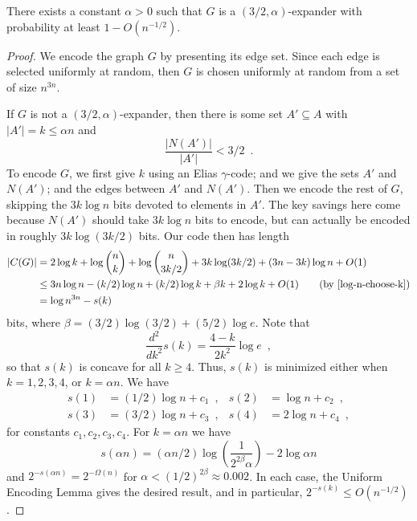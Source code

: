 \documentclass{patmorin}
\begin{document}
\begin{thm}
  There exists a constant $\alpha >0$ such that $G$ is a
  $(3/2,\alpha)$-expander with probability at least $1 - O(n^{-1/2})$.
\end{thm}

\begin{proof}
  We encode the graph $G$ by presenting its edge set. Since each edge
  is selected uniformly at random, then $G$ is chosen uniformly at
  random from a set of size $n^{3n}$.
  
  If $G$ is not a $(3/2, \alpha)$-expander, then there is some set $A'
  \subseteq A$ with $|A'|=k\le \alpha n$ and
  \[
  \frac{|N(A')|}{|A'|} < 3/2 \enspace .
  \]
  To encode $G$, we first give $k$ using an Elias $\gamma$-code; and
  we give the sets $A'$ and $N(A')$; and the edges between $A'$ and
  $N(A')$. Then we encode the rest of $G$, skipping the $3k\log n$
  bits devoted to elements in $A'$.  The key savings here come because
  $N(A')$ should take $3k\log n$ bits to encode, but can actually be
  encoded in roughly $3k\log(3k/2)$ bits. Our code then has length
  \begin{align*}
    |C(G)| &= 2\log k + \log {n \choose k} + \log {n \choose 3k/2} + 3k \log (3k/2) + (3n - 3k)\log n + O(1) \\
           &\leq 3n \log n - (k/2)\log n + (k/2)\log k + \beta k + 2 \log k + O(1) \tag{by \eqref{log-n-choose-k}}\\
           &= \log n^{3n} - s(k)
  \end{align*}
  bits, where $\beta = (3/2) \log (3/2) + (5/2) \log e$. Note that
  \[
    \frac{d^2}{dk^2} s(k) = \frac{4 - k}{2 k^2} \log e \enspace ,
  \]
  so that $s(k)$ is concave for all $k \geq 4$. Thus, $s(k)$ is
  minimized either when $k = 1, 2, 3, 4$, or $k = \alpha n$. We have
  \begin{align*}
    s(1) &= (1/2)\log n + c_1 \enspace , & 
    s(2) &= \log n + c_2 \enspace , \\
    s(3) &= (3/2) \log n + c_3 \enspace , &
    s(4) &= 2 \log n + c_4 \enspace ,
  \end{align*}
  for constants $c_1, c_2, c_3, c_4$. For $k=\alpha n$ we have
  \[
    s(\alpha n) = (\alpha n/2)\log \left(\frac{1}{2^{2\beta}
        \alpha}\right) - 2 \log \alpha n
  \]
  and $2^{-s(\alpha n)} = 2^{-\Omega(n)}$ for
  $\alpha < (1/2)^{2\beta} \approx 0.002$. In each case, the Uniform
  Encoding Lemma gives the desired result, and in particular,
  $2^{-s(k)} \leq O(n^{-1/2})$.
\end{proof}
\end{document}

